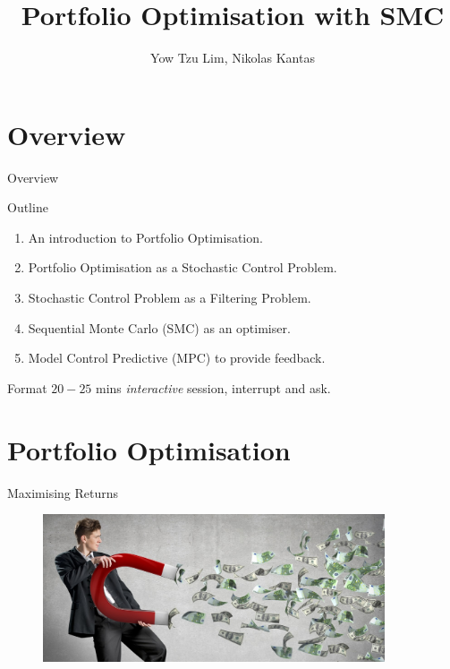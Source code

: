 \documentclass[handout]{beamer}
\title{Portfolio Optimisation with SMC}
\author{Yow Tzu Lim, Nikolas Kantas}
\begin{document}
\begin{frame}
\maketitle
\end{frame}

\section{Overview}
\begin{frame}{Overview}
\begin{block}{Outline}
\begin{enumerate}
\item An introduction to Portfolio Optimisation.
\item Portfolio Optimisation as a Stochastic Control Problem.
\item Stochastic Control Problem as a Filtering Problem.
\item Sequential Monte Carlo (SMC) as an optimiser.
\item Model Control Predictive (MPC) to provide feedback.
\end{enumerate}
\end{block}
\begin{block}{Format}
$20-25$ mins \emph{interactive} session, interrupt and ask.
\end{block}
\end{frame}

\section{Portfolio Optimisation}
\begin{frame}{Maximising Returns}
  \begin{figure}
    \centering
    \includegraphics[width = 0.9\textwidth]{figures/magnetmoney.jpg}
  \end{figure}
\end{frame}
\end{document}
